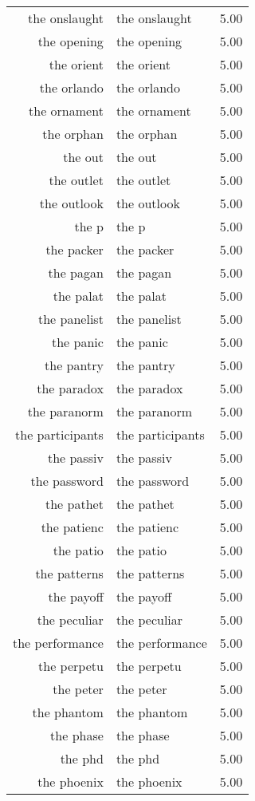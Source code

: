 \begin{table}[ht]
\begin{tabular}{rlr}
  the onslaught & the onslaught & 5.00 \\ 
  the opening & the opening & 5.00 \\ 
  the orient & the orient & 5.00 \\ 
  the orlando & the orlando & 5.00 \\ 
  the ornament & the ornament & 5.00 \\ 
  the orphan & the orphan & 5.00 \\ 
  the out & the out & 5.00 \\ 
  the outlet & the outlet & 5.00 \\ 
  the outlook & the outlook & 5.00 \\ 
  the p & the p & 5.00 \\ 
  the packer & the packer & 5.00 \\ 
  the pagan & the pagan & 5.00 \\ 
  the palat & the palat & 5.00 \\ 
  the panelist & the panelist & 5.00 \\ 
  the panic & the panic & 5.00 \\ 
  the pantry & the pantry & 5.00 \\ 
  the paradox & the paradox & 5.00 \\ 
  the paranorm & the paranorm & 5.00 \\ 
  the participants & the participants & 5.00 \\ 
  the passiv & the passiv & 5.00 \\ 
  the password & the password & 5.00 \\ 
  the pathet & the pathet & 5.00 \\ 
  the patienc & the patienc & 5.00 \\ 
  the patio & the patio & 5.00 \\ 
  the patterns & the patterns & 5.00 \\ 
  the payoff & the payoff & 5.00 \\ 
  the peculiar & the peculiar & 5.00 \\ 
  the performance & the performance & 5.00 \\ 
  the perpetu & the perpetu & 5.00 \\ 
  the peter & the peter & 5.00 \\ 
  the phantom & the phantom & 5.00 \\ 
  the phase & the phase & 5.00 \\ 
  the phd & the phd & 5.00 \\ 
  the phoenix & the phoenix & 5.00 \\ 

\end{tabular}
\end{table}
